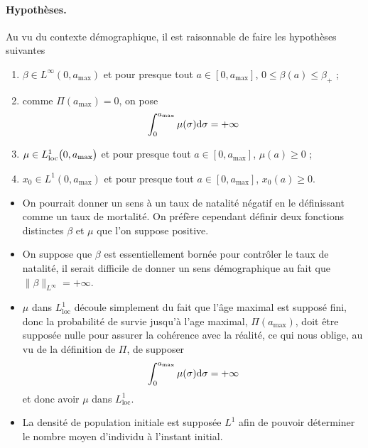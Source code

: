 \paragraph{Hypothèses.} Au vu du contexte démographique, il est raisonnable de faire les hypothèses suivantes 
\begin{enumerate}
    \item $\beta \in L^{\infty}(0,a_{\max})$ et pour presque tout $a \in [0,a_{\max}]$, $0 \leq \beta(a) \leq \beta_+$ ;
    \item comme $\Pi(a_{\max}) = 0$, on pose
    \begin{equation*}
        \int_0^{a_{\max}}\mu(\sigma)\mathrm{d} \sigma = +\infty
    \end{equation*}
    \item $\mu \in L^1_{\text{loc}}\big(0,a_{\max}\big)$ et pour presque tout 
    $a \in [0,a_{\max}]$, $\mu(a) \geq 0$ ;
    \item $x_0 \in L^1(0,a_{\max})$ et pour presque tout $a \in [0,a_{\max}]$, $x_0(a) \geq 0$.
\end{enumerate}

\begin{remark}
    \begin{itemize}
        \item On pourrait donner un sens à un taux de natalité négatif en le définissant comme un taux de mortalité. On préfère cependant définir deux fonctions distinctes $\beta$ et $\mu$ que l'on suppose positive.
        \item On suppose que $\beta$ est essentiellement bornée pour contrôler le taux de natalité, il serait difficile de donner un sens démographique au fait que $\|\beta\|_{L^{\infty}} = +\infty$.
        \item $\mu$ dans $L^1_{\text{loc}}$ découle simplement du fait que l'âge maximal est supposé fini, donc la probabilité de survie jusqu'à l'age maximal, $\Pi(a_{\max})$, doit être supposée nulle pour assurer la cohérence avec la réalité, ce qui nous oblige, au vu de la définition de $\Pi$, de supposer
        \begin{equation*}
            \int_0^{a_{\max}}\mu(\sigma)\mathrm{d} \sigma = +\infty
        \end{equation*}
        et donc avoir $\mu$ dans $L^1_{\text{loc}}$.
        \item La densité de population initiale est supposée $L^1$ afin de pouvoir déterminer le nombre moyen d'individu à l'instant initial.
    \end{itemize}
\end{remark}